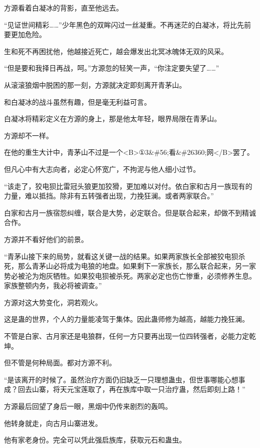 
\begin{this_body}

方源看着白凝冰的背影，直至他远去。

“见证世间精彩……”少年黑色的双眸闪过一丝凝重。不再迷茫的白凝冰，将比先前要更加危险。

生和死不再困扰他，他越接近死亡，越会爆发出北冥冰魄体无双的风采。

“但是要和我择日再战，呵。”方源忽的轻笑一声，“你注定要失望了……”

从滚滚狼烟中脱困的那一刻，方源就决定即刻离开青茅山。

和白凝冰的战斗虽然有趣，但是毫无利益可言。

白凝冰将精彩定义在方源的身上，那是他太年轻，眼界局限在青茅山。

方源却不一样。

在他的重生大计中，青茅山不过是一个<B>①3\&\#56;看\&\#26360;网</B>罢了。

但凡心中有大志向者，必定心怀宽广，不拘泥与他人细小过节。

“该走了，狡电狈比雷冠头狼更加狡猾，更加难以对付。依白家和古月一族现有的力量，难以抵挡。除非有五转强者出现，力挽狂澜。或者两家联合。”

白家和古月一族宿怨纠缠，联合是大势，必定联合。但是联合起来，却做不到精诚合作。

方源并不看好他们的前景。

“青茅山接下来的局势，就看这关键一战的结果。如果两家族长全部被狡电狈杀死，那么青茅山必将成为电狼的地盘。如果剩下一家族长，那么联合起来，另一家势必被沦为炮灰牺牲。如果狡电狈被杀死。两家必定也伤亡惨重，必须修养生息。家族整顿内务，我必将被调查。”

方源对这大势变化，洞若观火。

这是蛊的世界，个人的力量能凌驾于集体。因此蛊师修为越高，越能力挽狂澜。

不管是白家、古月家还是电狼群，任何一方只要再出现一位四转强者，必能力定乾坤。

但不管是何种局面。都对方源不利。

“是该离开的时候了。虽然治疗方面仍旧缺乏一只理想蛊虫，但世事哪能心想事成？回去山寨，将天元宝莲取了，再在族库中取一只治疗蛊，然后即刻上路！”

方源最后回望了身后一眼，黑烟中仍传来剧烈的轰鸣。

他转身就走，向古月山寨进发。

他有家老身份。完全可以凭此强启族库，获取元石和蛊虫。


\end{this_body}
